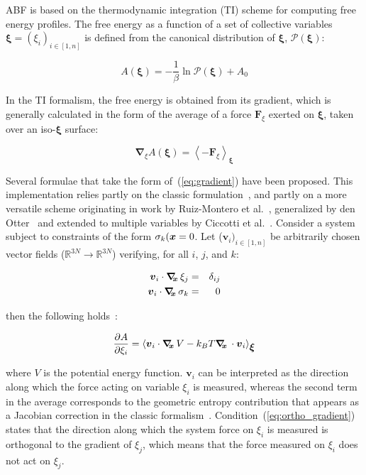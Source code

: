 ABF is based on the thermodynamic integration (TI) scheme for
computing free energy profiles. The free energy as a function
of a set of collective variables $\bm{\xi}=(\xi_i)_{i\in[1,n]}$
is defined from the canonical distribution of $\bm{\xi}$, ${\mathcal P}(\bm{\xi})$:

\begin{equation}
  \label{eq:free}
  A(\bm{\xi}) = -\frac{1}{\beta} \ln {\mathcal P}(\bm{\xi}) + A_0
\end{equation}

In the TI formalism, the free energy is obtained from its gradient, 
which is generally calculated in the form of the average of a force
$\bm{F}_\xi$ exerted on $\bm{\xi}$, taken over an iso-$\bm{\xi}$ surface:

\begin{equation}
  \label{eq:gradient}
  \bm{\nabla}_\xi A(\bm{\xi}) = \left\langle -\bm{F}_\xi \right\rangle_\bm{\xi}
\end{equation}

Several formulae that take the form of~(\ref{eq:gradient}) have been proposed.
This implementation relies partly on the classic formulation~\cite{Carter1989},
and partly on a more versatile scheme originating in work by Ruiz-Montero et
al.~\cite{Ruiz-Montero1997}, generalized by den Otter~\cite{denOtter2000} and
extended to multiple variables by Ciccotti et al.~\cite{Ciccotti2005}.
Consider a system subject to constraints of the form $\sigma_k(\vx) = 0$.
Let ($\bm{v}_i)_{i\in[1,n]}$ be arbitrarily chosen vector fields
($\mathbb{R}^{3N}\rightarrow\mathbb{R}^{3N}$) verifying, for all $i$, $j$,
and $k$:

\begin{eqnarray}
\label{eq:ortho_gradient}
\bm{v}_i \cdot \gradx \xi_j    & = & \delta_{ij}\\
\label{eq:ortho_constraints}
\bm{v}_i \cdot \gradx \sigma_k & = & 0
\end{eqnarray}

then the following holds~\cite{Ciccotti2005}:

\begin{equation}
\label{eq:gradient_vector}
\frac{\partial A}{\partial \xi_i} = \left\langle \bm{v}_i \cdot \gradx V
- k_B T \gradx \cdot \bm{v}_i \right\rangle_\bm{\xi}
\end{equation}

where $V$ is the potential energy function.
$\bm{v}_i$ can be interpreted as the direction along which the force
acting on variable $\xi_i$ is measured, whereas the second term in the
average corresponds to the geometric entropy contribution that appears
as a Jacobian correction in the classic formalism~\cite{Carter1989}.
Condition~(\ref{eq:ortho_gradient}) states that the direction along
which the system force on $\xi_i$ is measured is orthogonal to the
gradient of $\xi_j$, which means that the force measured on $\xi_i$
does not act on $\xi_j$.


